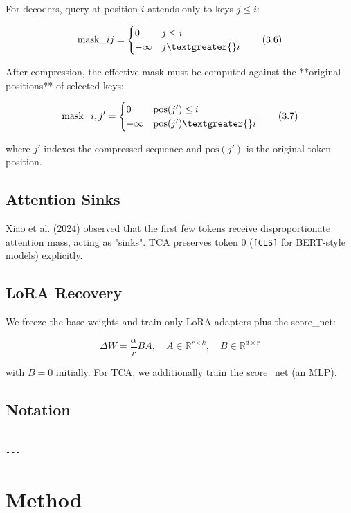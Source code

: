 For decoders, query at position $i$ attends only to keys $j \leq i$:

\[
\text{mask}\_{ij} = \begin{cases} 0 & j \leq i \\ -\infty & j \textgreater{} i \end{cases}
\tag{3.6}
\]

After compression, the effective mask must be computed against the **original 
positions** of selected keys:

\[
\text{mask}\_{i, j'} = \begin{cases} 0 & \text{pos}(j') \leq i \\ -\infty & \text{pos}(j') \textgreater{} i \end{cases}
\tag{3.7}
\]

where $j'$ indexes the compressed sequence and $\text{pos}(j')$ is the 
original token position.

\subsection{Attention Sinks}

Xiao et al. (2024) observed that the first few tokens receive disproportionate 
attention mass, acting as "sinks". TCA preserves token 0 (\texttt{[CLS]} for BERT-style 
models) explicitly.

\subsection{LoRA Recovery}

We freeze the base weights and train only LoRA adapters plus the score\_net:

\[
\Delta W = \frac{\alpha}{r} B A, \quad A \in \mathbb{R}^{r \times k}, \quad B \in \mathbb{R}^{d \times r}
\tag{3.8}
\]

with $B = 0$ initially. For TCA, we additionally train the score\_net (an MLP).



\subsection{Notation}

\begin{lstlisting}

---
\end{lstlisting}

\section{Method}

